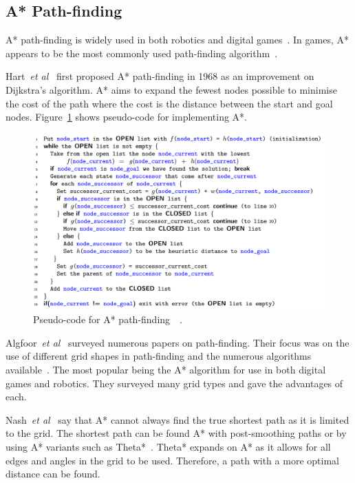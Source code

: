 \documentclass[journal]{IEEEtran}
\begin{document}
	\subsection{A* Path-finding} \label{A*PF}
	A* path-finding is widely used in both robotics and digital games~\cite{Algfoor2015}. In games, A* appears to be the most commonly used path-finding algorithm~\cite{Algfoor2015}.
	
	Hart~\textit{et al}~\cite{Hart1968} first proposed A* path-finding in 1968 as an improvement on Dijkstra's algorithm. A* aims to expand the fewest nodes possible to minimise the cost of the path where the cost is the distance between the start and goal nodes. Figure~\ref{A*Pseudo} shows pseudo-code for implementing A*. 
	
	\begin{figure}[h]
		\includegraphics[width=1.0\linewidth]{APseudocode.png}
		\caption{Pseudo-code for A* path-finding~\cite{Hart1968}~\cite{pseudocode:A*}.}
		\label{A*Pseudo}
	\end{figure} 
	
	Algfoor~\textit{et al}~\cite{Algfoor2015} surveyed numerous papers on path-finding. Their focus was on the use of different grid shapes in path-finding and the numerous algorithms available~\cite{Algfoor2015}. The most popular being the A* algorithm for use in both digital games and robotics. They surveyed many grid types and gave the advantages of each. 
	
	Nash~\textit{et al}~\cite{Nash2007} say that A* cannot always find the true shortest path as it is limited to the grid. The shortest path can be found A* with post-smoothing paths or by using A* variants such as Theta*~\cite{Nash2007, Firmansyah2016}. Theta* expands on A* as it allows for all edges and angles in the grid to be used. Therefore, a path with a more optimal distance can be found.
	
\end{document}
